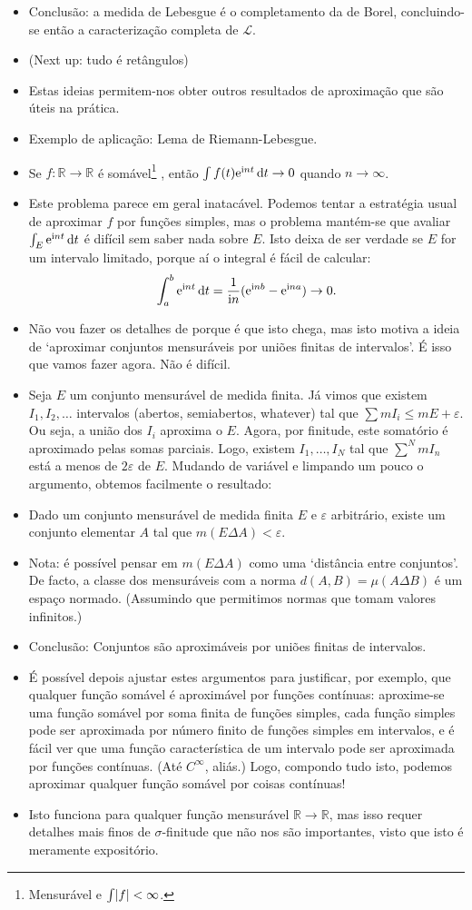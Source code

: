 \documentclass{article}
\newcommand{\R}{\mathbb{R}}
\newcommand{\e}{\mathrm{e}}
\newcommand{\I}{\mathrm{i}}
\renewcommand{\cal}[1]{\mathcal{#1}}
\begin{document}
\begin{itemize}
\item Conclusão: a medida de Lebesgue é o completamento da de Borel, concluindo-se então a caracterização completa de $\cal L$.
\item (Next up: tudo é retângulos)
\item Estas ideias permitem-nos obter outros resultados de aproximação que são úteis na prática.
\item Exemplo de aplicação: Lema de Riemann-Lebesgue.
\item Se $f : \R \to \R$ é somável\footnote{Mensurável e $\int \abs f < \infty$.} , então $\int f(t) \e^{\I n t} \dif t \to 0$ quando $n \to \infty$.
\item Este problema parece em geral inatacável. Podemos tentar a estratégia usual de aproximar $f$ por funções simples, mas o problema mantém-se que avaliar $\int_E \e^{\I n t} \dif t$ é difícil sem saber nada sobre $E$. Isto deixa de ser verdade se $E$ for um intervalo limitado, porque aí o integral é fácil de calcular:
\[\int_a^b \e^{\I n t} \dif t = \frac1{\I n} (\e^{\I n b} - \e^{\I n a}) \to 0.\]
\item Não vou fazer os detalhes de porque é que isto chega, mas isto motiva a ideia de `aproximar conjuntos mensuráveis por uniões finitas de intervalos'. É isso que vamos fazer agora. Não é difícil.
\item Seja $E$ um conjunto mensurável de medida finita. Já vimos que existem $I_1, I_2, \dots$ intervalos (abertos, semiabertos, whatever) tal que $\sum m I_i \leq m E + \varepsilon$. Ou seja, a união dos $I_i$ aproxima o $E$. Agora, por finitude, este somatório é aproximado pelas somas parciais. Logo, existem $I_1, \dots, I_N$ tal que $\sum^N m I_n$ está a menos de $2 \varepsilon$ de $E$. Mudando de variável e limpando um pouco o argumento, obtemos facilmente o resultado:
\item Dado um conjunto mensurável de medida finita $E$ e $\varepsilon$ arbitrário, existe um conjunto elementar $A$ tal que $m(E \Delta A) < \varepsilon$.
\item Nota: é possível pensar em $m(E \Delta A)$ como uma `distância entre conjuntos'. De facto, a classe dos mensuráveis com a norma $d(A,B) = \mu(A \Delta B)$ é um espaço normado. (Assumindo que permitimos normas que tomam valores infinitos.)
\item Conclusão: Conjuntos são aproximáveis por uniões finitas de intervalos.
\item É possível depois ajustar estes argumentos para justificar, por exemplo, que qualquer função somável é aproximável por funções contínuas: aproxime-se uma função somável por soma finita de funções simples, cada função simples pode ser aproximada por número finito de funções simples em intervalos, e é fácil ver que uma função característica de um intervalo pode ser aproximada por funções contínuas. (Até $C^\infty$, aliás.) Logo, compondo tudo isto, podemos aproximar qualquer função somável por coisas contínuas!
\item Isto funciona para qualquer função mensurável $\R \to \R$, mas isso requer detalhes mais finos de $\sigma$-finitude que não nos são importantes, visto que isto é meramente expositório.
\end{itemize}
\end{document}
